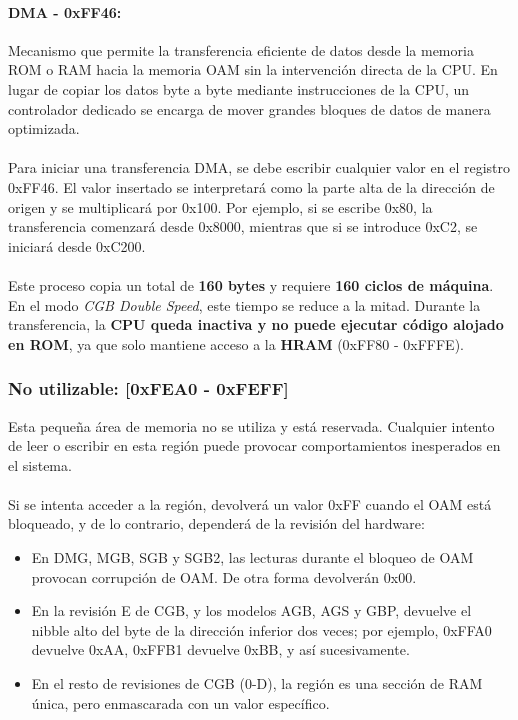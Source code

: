 \label{dma}
\paragraph{DMA - 0xFF46:} Mecanismo que permite la transferencia eficiente de datos desde la memoria ROM o RAM hacia la memoria OAM sin la intervención directa de la CPU. En lugar de copiar los datos byte a byte mediante instrucciones de la CPU, un controlador dedicado se encarga de mover grandes bloques de datos de manera optimizada.
\\\\
Para iniciar una transferencia DMA, se debe escribir cualquier valor en el registro 0xFF46. El valor insertado se interpretará como la parte alta de la dirección de origen y se multiplicará por 0x100. Por ejemplo, si se escribe 0x80, la transferencia comenzará desde 0x8000, mientras que si se introduce 0xC2, se iniciará desde 0xC200.
\\\\
Este proceso copia un total de \textbf{160 bytes} y requiere \textbf{160 ciclos de máquina}. En el modo \textit{CGB Double Speed}, este tiempo se reduce a la mitad. Durante la transferencia, la \textbf{CPU queda inactiva y no puede ejecutar código alojado en ROM}, ya que solo mantiene acceso a la \textbf{HRAM} (0xFF80 - 0xFFFE).


\subsubsection{No utilizable: [0xFEA0 - 0xFEFF]}
Esta pequeña área de memoria no se utiliza y está reservada. Cualquier intento de leer o escribir en esta región puede provocar comportamientos inesperados en el sistema.
\\\\
Si se intenta acceder a la región, devolverá un valor 0xFF cuando el OAM está bloqueado, y de lo contrario, dependerá de la revisión del hardware:

\begin{itemize}
    \item En DMG, MGB, SGB y SGB2, las lecturas durante el bloqueo de OAM provocan corrupción de OAM. De otra forma devolverán 0x00.
    \item En la revisión E de CGB, y los modelos AGB, AGS y GBP, devuelve el nibble alto del byte de la dirección inferior dos veces; por ejemplo, 0xFFA0 devuelve 0xAA, 0xFFB1 devuelve 0xBB, y así sucesivamente.
    \item En el resto de revisiones de CGB (0-D), la región es una sección de RAM única, pero enmascarada con un valor específico.
\end{itemize}

